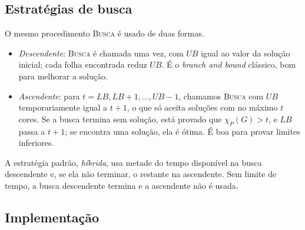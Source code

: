 \documentclass[12pt]{article}
\newcommand{\chiP}{\chi_P}
\newcommand{\LB}{\mathit{LB}}
\newcommand{\UB}{\mathit{UB}}
\begin{document}
\subsection{Estratégias de busca}

O mesmo procedimento \textsc{Busca} é usado de duas formas.
\begin{itemize}
  \item \emph{Descendente}: \textsc{Busca} é chamada uma vez, com $\UB$
    igual ao valor da solução inicial; cada folha encontrada reduz $\UB$.
    É o \emph{branch and bound} clássico, bom para melhorar a solução.
  \item \emph{Ascendente}: para $t=\LB,\LB+1,\dots,\UB-1$, chamamos
    \textsc{Busca} com $\UB$ temporariamente igual a $t+1$, o que só aceita
    soluções com no máximo $t$ cores. Se a busca termina sem solução, está
    provado que $\chiP(G)>t$, e $\LB$ passa a $t+1$; se encontra uma
    solução, ela é ótima. É boa para provar limites inferiores.
\end{itemize}
A estratégia padrão, \emph{híbrida}, usa metade do tempo disponível na
busca descendente e, se ela não terminar, o restante na ascendente. Sem limite
de tempo, a busca descendente termina e a ascendente não é usada.

\subsection{Implementação}
\end{document}

